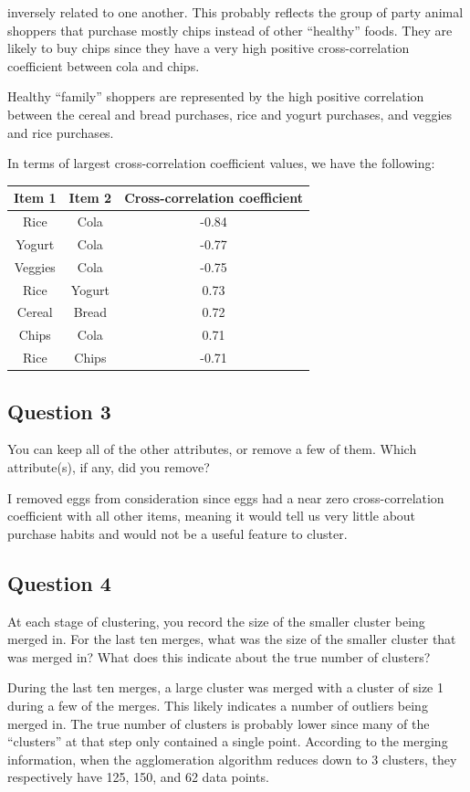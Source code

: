 \documentclass{math}
\begin{document}
inversely related to one another. This probably reflects the group of party
animal shoppers that purchase mostly chips instead of other ``healthy'' foods.
They are likely to buy chips since they have a very high positive
cross-correlation coefficient between cola and chips. \par
Healthy ``family'' shoppers are represented by the high positive correlation
between the cereal and bread purchases, rice and yogurt purchases, and veggies
and rice purchases. \par
In terms of largest cross-correlation coefficient values, we have the following:
\begin{center}
  \begin{tabular}{|c|c|c|}
    \hline
    Item 1 & Item 2 & Cross-correlation coefficient \\
    \hline
    Rice & Cola & -0.84 \\
    Yogurt & Cola & -0.77 \\
    Veggies & Cola & -0.75 \\
    Rice & Yogurt & 0.73 \\
    Cereal & Bread & 0.72 \\
    Chips & Cola & 0.71 \\
    Rice & Chips & -0.71 \\
    \hline
  \end{tabular}
\end{center}

\subsection*{Question 3}
You can keep all of the other attributes, or remove a few of them. Which
attribute(s), if any, did you remove? \par
I removed eggs from consideration since eggs had a near zero cross-correlation
coefficient with all other items, meaning it would tell us very little about
purchase habits and would not be a useful feature to cluster.

\subsection*{Question 4}
At each stage of clustering, you record the size of the smaller cluster being
merged in. For the last ten merges, what was the size of the smaller cluster
that was merged in? What does this indicate about the true number of clusters?
\par
During the last ten merges, a large cluster was merged with a cluster of size 1
during a few of the merges. This likely indicates a number of outliers being
merged in. The true number of clusters is probably lower since many of the
``clusters'' at that step only contained a single point. According to the
merging information, when the agglomeration algorithm reduces down to 3
clusters, they respectively have 125, 150, and 62 data points.
\end{document}
